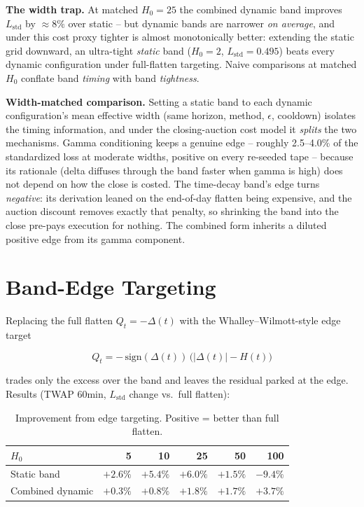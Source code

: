 \documentclass[11pt]{article}
\begin{document}
\begin{whybox}
\textbf{The width trap.} At matched $H_0 = 25$ the combined dynamic band improves
$L_{\text{std}}$ by $\approx 8\%$ over static -- but dynamic bands are narrower
\emph{on average}, and under this cost proxy tighter is almost monotonically better:
extending the static grid downward, an ultra-tight \emph{static} band ($H_0 = 2$,
$L_{\text{std}} = 0.495$) beats every dynamic configuration under full-flatten
targeting. Naive comparisons at matched $H_0$ conflate band \emph{timing} with band
\emph{tightness}.
\end{whybox}

\textbf{Width-matched comparison.} Setting a static band to each dynamic
configuration's mean effective width (same horizon, method, $\epsilon$, cooldown)
isolates the timing information, and under the closing-auction cost model it
\emph{splits} the two mechanisms. Gamma conditioning keeps a genuine edge -- roughly
2.5--4.0\% of the standardized loss at moderate widths, positive on every re-seeded
tape -- because its rationale (delta diffuses through the band faster when gamma is
high) does not depend on how the close is costed. The time-decay band's edge turns
\emph{negative}: its derivation leaned on the end-of-day flatten being expensive, and
the auction discount removes exactly that penalty, so shrinking the band into the close
pre-pays execution for nothing. The combined form inherits a diluted positive edge from
its gamma component.

\section{Band-Edge Targeting}

Replacing the full flatten $Q_t = -\Delta(t)$ with the Whalley--Wilmott-style
edge target

\begin{eqbox}
\begin{equation}
Q_t = -\,\mathrm{sign}(\Delta(t))\,\big(\lvert\Delta(t)\rvert - H(t)\big)
\end{equation}
\end{eqbox}

trades only the excess over the band and leaves the residual parked at the edge.
Results (TWAP 60min, $L_{\text{std}}$ change vs.\ full flatten):

\begin{table}[htbp]
\centering
\small
\begin{tabular}{lrrrrr}
\toprule
$H_0$ & 5 & 10 & 25 & 50 & 100 \\
\midrule
Static band        & $+2.6\%$ & $+5.4\%$ & $+6.0\%$ & $+1.5\%$ & $-9.4\%$ \\
Combined dynamic   & $+0.3\%$ & $+0.8\%$ & $+1.8\%$ & $+1.7\%$ & $+3.7\%$  \\
\bottomrule
\end{tabular}
\caption{Improvement from edge targeting. Positive = better than full flatten.}
\end{table}
\end{document}
